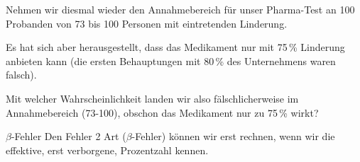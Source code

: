 Nehmen wir diesmal wieder den Annahmebereich für unser Pharma-Test an 100
Probanden von 73 bis 100 Personen mit eintretenden Linderung.

Es hat sich aber herausgestellt, dass das Medikament nur mit 75\,\%
Linderung anbieten kann (die ersten Behauptungen mit 80\,\% des
Unternehmens waren falsch).

Mit welcher Wahrscheinlichkeit landen wir also fälschlicherweise im Annahmebereich (73-100),
obschon das Medikament nur zu 75\,\% wirkt?

\begin{bemerkung}{$\beta$-Fehler}{}
  Den Fehler 2 Art ($\beta$-Fehler) können wir erst rechnen,
  wenn wir die effektive, erst verborgene, Prozentzahl kennen.
\end{bemerkung}


